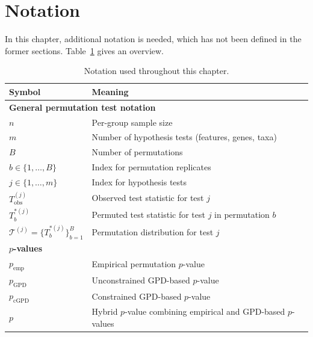 \section*{Notation}
\label{sec:6perm:notation}

In this chapter, additional notation is needed, which has not been defined in the former sections. Table~\ref{tab:6perm:notation} gives an overview.

\begin{table}[H]
\centering
\caption{Notation used throughout this chapter.}
\label{tab:6perm:notation}
\begin{tabularx}{\textwidth}{lX}
\toprule
\textbf{Symbol} & \textbf{Meaning} \\
\midrule
\multicolumn{2}{l}{\textbf{General permutation test notation}} \\[2pt]
$n$ & Per-group sample size \\
$m$ & Number of hypothesis tests (features, genes, taxa) \\
$B$ & Number of permutations \\
$b \in \{1,\dots,B\}$ & Index for permutation replicates \\
$j \in \{1,\dots,m\}$ & Index for hypothesis tests \\
$T_{\text{obs}}^{(j)}$ & Observed test statistic for test $j$ \\
$T_b^{*(j)}$ & Permuted test statistic for test $j$ in permutation $b$ \\
$\mathcal{T}^{(j)} = \{T_b^{*(j)}\}_{b=1}^B$ & Permutation distribution for test $j$ \\
\midrule

\multicolumn{2}{l}{\textbf{$p$-values}} \\[2pt]
$p_{\mathrm{emp}}$ & Empirical permutation $p$-value \\
$p_{\mathrm{GPD}}$ & Unconstrained GPD-based $p$-value \\
$p_{\mathrm{cGPD}}$ & Constrained GPD-based $p$-value \\
$p$ & Hybrid $p$-value combining empirical and GPD-based $p$-values \\
\midrule


\end{tabularx}
\end{table}
